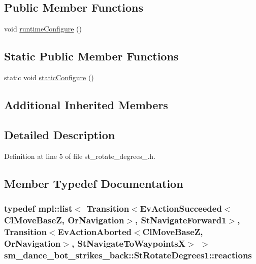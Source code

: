 \subsection*{Public Member Functions}
\begin{DoxyCompactItemize}
\item 
void \hyperlink{structsm__dance__bot__strikes__back_1_1StRotateDegrees1_acc975cf0fb7eb2b7e606f456e96953fa}{runtime\+Configure} ()
\end{DoxyCompactItemize}
\subsection*{Static Public Member Functions}
\begin{DoxyCompactItemize}
\item 
static void \hyperlink{structsm__dance__bot__strikes__back_1_1StRotateDegrees1_a4e1e6d270be9a2d3899176e284ef7860}{static\+Configure} ()
\end{DoxyCompactItemize}
\subsection*{Additional Inherited Members}


\subsection{Detailed Description}


Definition at line 5 of file st\+\_\+rotate\+\_\+degrees\+\_.\+h.



\subsection{Member Typedef Documentation}
\subsubsection[{\texorpdfstring{reactions}{reactions}}]{\setlength{\rightskip}{0pt plus 5cm}typedef mpl\+::list$<$ Transition$<$Ev\+Action\+Succeeded$<${\bf Cl\+Move\+BaseZ}, {\bf Or\+Navigation}$>$, {\bf St\+Navigate\+Forward1}$>$, Transition$<$Ev\+Action\+Aborted$<${\bf Cl\+Move\+BaseZ}, {\bf Or\+Navigation}$>$, {\bf St\+Navigate\+To\+WaypointsX}$>$ $>$ {\bf sm\+\_\+dance\+\_\+bot\+\_\+strikes\+\_\+back\+::\+St\+Rotate\+Degrees1\+::reactions}}\hypertarget{structsm__dance__bot__strikes__back_1_1StRotateDegrees1_ac753fd21a410d0201e6577ada7edcaa4}{}\label{structsm__dance__bot__strikes__back_1_1StRotateDegrees1_ac753fd21a410d0201e6577ada7edcaa4}


